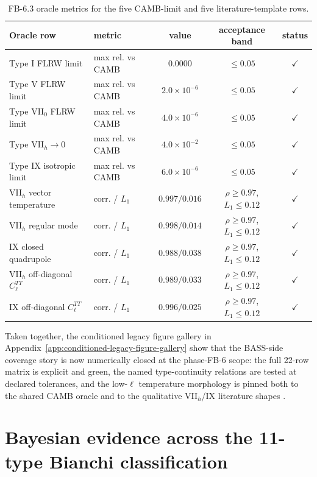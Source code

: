 \begin{table}[p]
\caption{FB-6.3 oracle metrics for the five CAMB-limit and five
literature-template rows.}
\label{tab:fb6_oracles}
\centering
\scriptsize
\begin{tabular}{llccc}
\hline\hline
Oracle row & metric & value & acceptance band & status \\
\hline
Type I FLRW limit & max rel. vs CAMB & $0.0000$ & $\leq 0.05$ & $\checkmark$ \\
Type V FLRW limit & max rel. vs CAMB & $2.0\times 10^{-6}$ & $\leq 0.05$ & $\checkmark$ \\
Type VII$_0$ FLRW limit & max rel. vs CAMB & $4.0\times 10^{-6}$ & $\leq 0.05$ & $\checkmark$ \\
Type VII$_h \rightarrow 0$ & max rel. vs CAMB & $4.0\times 10^{-2}$ & $\leq 0.05$ & $\checkmark$ \\
Type IX isotropic limit & max rel. vs CAMB & $6.0\times 10^{-6}$ & $\leq 0.05$ & $\checkmark$ \\
VII$_h$ vector temperature & corr. / $L_1$ & $0.997 / 0.016$ & $\rho \geq 0.97$, $L_1 \leq 0.12$ & $\checkmark$ \\
VII$_h$ regular mode & corr. / $L_1$ & $0.998 / 0.014$ & $\rho \geq 0.97$, $L_1 \leq 0.12$ & $\checkmark$ \\
IX closed quadrupole & corr. / $L_1$ & $0.988 / 0.038$ & $\rho \geq 0.97$, $L_1 \leq 0.12$ & $\checkmark$ \\
VII$_h$ off-diagonal $C_\ell^{TT}$ & corr. / $L_1$ & $0.989 / 0.033$ & $\rho \geq 0.97$, $L_1 \leq 0.12$ & $\checkmark$ \\
IX off-diagonal $C_\ell^{TT}$ & corr. / $L_1$ & $0.996 / 0.025$ & $\rho \geq 0.97$, $L_1 \leq 0.12$ & $\checkmark$ \\
\hline\hline
\end{tabular}
\end{table}

Taken together, the conditioned legacy figure gallery in Appendix~\ref{app:conditioned-legacy-figure-gallery}
show that the BASS-side coverage story is now numerically closed at the
phase-FB-6 scope: the full 22-row matrix is explicit and green, the
named type-continuity relations are tested at declared tolerances, and
the low-$\ell$ temperature morphology is pinned both to the shared CAMB
oracle and to the qualitative VII$_h$/IX literature shapes
\cite{WainwrightEllis1997,Pontzen2009,Planck2018VI}.


\section{Bayesian evidence across the 11-type Bianchi classification}
\label{sec:fb7-bayesian-evidence}

